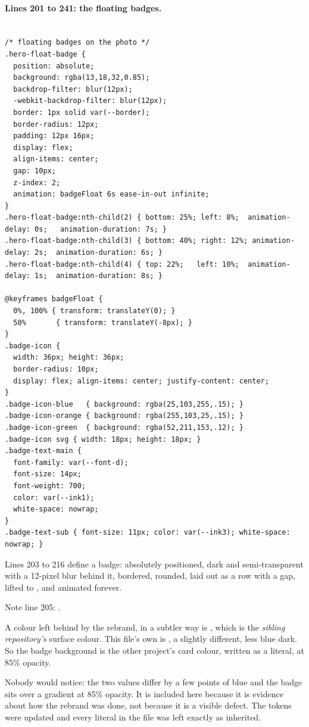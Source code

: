 \paragraph{Lines 201 to 241: the floating badges.}

\begin{lstlisting}[firstnumber=201,caption={\file{css/site.css}, lines 201--241}]

/* floating badges on the photo */
.hero-float-badge {
  position: absolute;
  background: rgba(13,18,32,0.85);
  backdrop-filter: blur(12px);
  -webkit-backdrop-filter: blur(12px);
  border: 1px solid var(--border);
  border-radius: 12px;
  padding: 12px 16px;
  display: flex;
  align-items: center;
  gap: 10px;
  z-index: 2;
  animation: badgeFloat 6s ease-in-out infinite;
}
.hero-float-badge:nth-child(2) { bottom: 25%; left: 8%;  animation-delay: 0s;   animation-duration: 7s; }
.hero-float-badge:nth-child(3) { bottom: 40%; right: 12%; animation-delay: 2s;  animation-duration: 6s; }
.hero-float-badge:nth-child(4) { top: 22%;   left: 10%;  animation-delay: 1s;  animation-duration: 8s; }

@keyframes badgeFloat {
  0%, 100% { transform: translateY(0); }
  50%       { transform: translateY(-8px); }
}
.badge-icon {
  width: 36px; height: 36px;
  border-radius: 10px;
  display: flex; align-items: center; justify-content: center;
}
.badge-icon-blue   { background: rgba(25,103,255,.15); }
.badge-icon-orange { background: rgba(255,103,25,.15); }
.badge-icon-green  { background: rgba(52,211,153,.12); }
.badge-icon svg { width: 18px; height: 18px; }
.badge-text-main {
  font-family: var(--font-d);
  font-size: 14px;
  font-weight: 700;
  color: var(--ink1);
  white-space: nowrap;
}
.badge-text-sub { font-size: 11px; color: var(--ink3); white-space: nowrap; }
\end{lstlisting}

Lines 203 to 216 define a badge: absolutely positioned, dark and semi-transparent
with a 12-pixel blur behind it, bordered, rounded, laid out as a row with a gap,
lifted to , and animated forever.

Note line 205: .

\begin{honest}{A colour left behind by the rebrand, in a subtler way}
 is , which is the \emph{sibling repository's}
 surface colour. This file's own  is , a
slightly different, less blue dark. So the badge background is the other project's
card colour, written as a literal, at 85\% opacity.

Nobody would notice: the two values differ by a few points of blue and the badge
sits over a gradient at 85\% opacity. It is included here because it is evidence
about how the rebrand was done, not because it is a visible defect. The tokens were
updated and every literal in the file was left exactly as inherited.
\end{honest}

